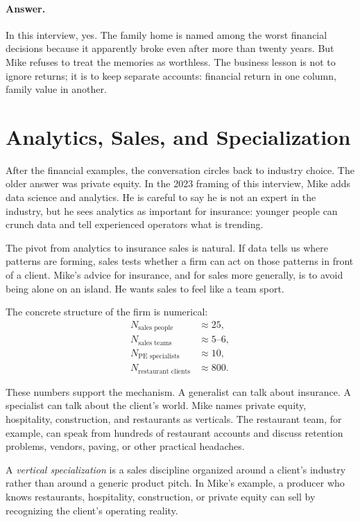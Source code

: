 \paragraph{Answer.}
In this interview, yes. The family home is named among the worst financial decisions because it apparently broke even after more than twenty years. But Mike refuses to treat the memories as worthless. The business lesson is not to ignore returns; it is to keep separate accounts: financial return in one column, family value in another.

\section{Analytics, Sales, and Specialization}

After the financial examples, the conversation circles back to industry choice. The older answer was private equity. In the 2023 framing of this interview, Mike adds data science and analytics. He is careful to say he is not an expert in the industry, but he sees analytics as important for insurance: younger people can crunch data and tell experienced operators what is trending.

The pivot from analytics to insurance sales is natural. If data tells us where patterns are forming, sales tests whether a firm can act on those patterns in front of a client. Mike's advice for insurance, and for sales more generally, is to avoid being alone on an island. He wants sales to feel like a team sport.

The concrete structure of the firm is numerical:
\begin{align}
N_{\text{sales people}} &\approx 25,\\
N_{\text{sales teams}} &\approx 5\text{--}6,\\
N_{\text{PE specialists}} &\approx 10,\\
N_{\text{restaurant clients}} &\approx 800.
\end{align}

These numbers support the mechanism. A generalist can talk about insurance. A specialist can talk about the client's world. Mike names private equity, hospitality, construction, and restaurants as verticals. The restaurant team, for example, can speak from hundreds of restaurant accounts and discuss retention problems, vendors, paving, or other practical headaches.

\begin{definition}
A \emph{vertical specialization} is a sales discipline organized around a client's industry rather than around a generic product pitch. In Mike's example, a producer who knows restaurants, hospitality, construction, or private equity can sell by recognizing the client's operating reality.
\end{definition}

